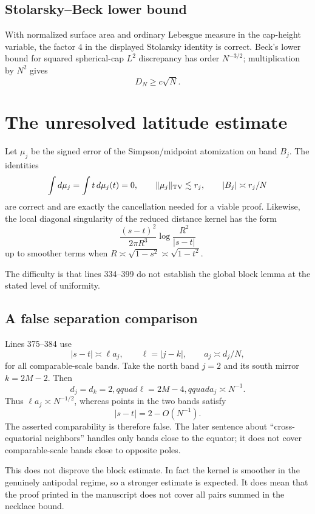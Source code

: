 \documentclass[11pt]{article}
\begin{document}
\subsection{Stolarsky--Beck lower bound}

With normalized surface area and ordinary Lebesgue measure in the cap-height
variable, the factor $4$ in the displayed Stolarsky identity is correct.
Beck's lower bound for squared spherical-cap $L^2$ discrepancy has order
$N^{-3/2}$; multiplication by $N^2$ gives
\[
 D_N\ge c\sqrt N.
\]

\section{The unresolved latitude estimate}

Let $\mu_j$ be the signed error of the Simpson/midpoint atomization on band
$B_j$.  The identities
\[
 \int d\mu_j=\int t\,d\mu_j(t)=0,
 \qquad \|\mu_j\|_{\rm TV}\lesssim r_j,
 \qquad |B_j|\asymp r_j/N
\]
are correct and are exactly the cancellation needed for a viable proof.
Likewise, the local diagonal singularity of the reduced distance kernel has
the form
\[
 \frac{(s-t)^2}{2\pi R^3}\log\frac{R^2}{|s-t|}
\]
up to smoother terms when $R\asymp\sqrt{1-s^2}\asymp\sqrt{1-t^2}$.

The difficulty is that lines 334--399 do not establish the global block
lemma at the stated level of uniformity.

\subsection{A false separation comparison}

Lines 375--384 use
\[
 |s-t|\asymp \ell a_j,
 \qquad \ell=|j-k|,
 \qquad a_j\asymp d_j/N,
\]
for all comparable-scale bands.  Take the north band $j=2$ and its south
mirror $k=2M-2$.  Then
\[
 d_j=d_k=2,qquad \ell=2M-4,qquad a_j\asymp N^{-1}.
\]
Thus $\ell a_j\asymp N^{-1/2}$, whereas points in the two bands satisfy
\[
 |s-t|=2-O(N^{-1}).
\]
The asserted comparability is therefore false.  The later sentence about
``cross-equatorial neighbors'' handles only bands close to the equator; it
does not cover comparable-scale bands close to opposite poles.

This does not disprove the block estimate.  In fact the kernel is smoother
in the genuinely antipodal regime, so a stronger estimate is expected.  It
does mean that the proof printed in the manuscript does not cover all pairs
summed in the necklace bound.
\end{document}
